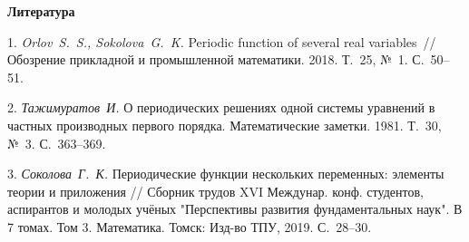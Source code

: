 \smallskip \centerline {\bf Литература} \nopagebreak

1. {\it Orlov~S.~S., Sokolova~G.~K.} Periodic function of several real variables~// Обозрение прикладной и промышленной математики. 2018. Т.~25, №~1. С.~50--51.

2. {\it Тажимуратов~И.} О периодических решениях одной системы уравнений в частных производных первого порядка. Математические заметки. 1981. Т.~30, №~3. С.~363--369.

3. {\it Соколова~Г.~К.} Периодические функции нескольких переменных: элементы теории и приложения // Сборник трудов XVI Междунар. конф. студентов, аспирантов и молодых учёных "Перспективы развития фундаментальных наук". В 7 томах. Том 3. Математика. Томск: Изд-во ТПУ, 2019. С.~28--30.

